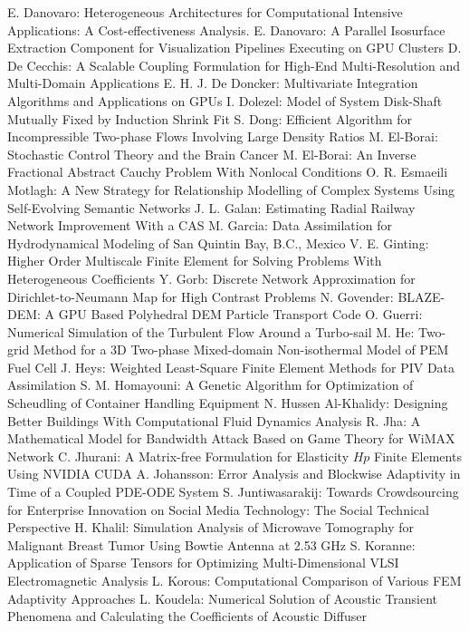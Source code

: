 \documentclass[10pt, A4]{article}%
\begin{document}
{E. Danovaro}: {Heterogeneous Architectures for Computational Intensive Applications: A Cost-effectiveness Analysis.}
{E. Danovaro}: {A Parallel Isosurface Extraction Component for Visualization Pipelines Executing on GPU Clusters}
{D. De Cecchis}: {A Scalable Coupling Formulation for High-End Multi-Resolution and Multi-Domain Applications}
{E. H. J. De Doncker}: {Multivariate Integration Algorithms and Applications on GPUs}
{I. Dolezel}: {Model of System Disk-Shaft Mutually Fixed by Induction Shrink Fit}
{S. Dong}: {Efficient Algorithm for Incompressible Two-phase Flows Involving Large Density Ratios}
{M. El-Borai}: {Stochastic Control Theory and the Brain Cancer}
{M. El-Borai}: {An Inverse Fractional Abstract Cauchy Problem With Nonlocal Conditions}
{O. R. Esmaeili Motlagh}: {A New Strategy for Relationship Modelling of Complex Systems Using Self-Evolving Semantic Networks}
{J. L. Galan}: {Estimating Radial Railway Network Improvement With a CAS}
{M. Garcia}: {Data Assimilation for Hydrodynamical Modeling of San Quintin Bay, B.C., Mexico}
{V. E. Ginting}: {Higher Order Multiscale Finite Element for Solving Problems With Heterogeneous Coefficients}
{Y. Gorb}: {Discrete Network Approximation for Dirichlet-to-Neumann Map for High Contrast Problems}
{N. Govender}: {BLAZE-DEM: A GPU Based Polyhedral DEM Particle Transport Code}
{O. Guerri}: {Numerical Simulation of the Turbulent Flow Around a Turbo-sail}
{M. He}: {Two-grid Method for a 3D Two-phase Mixed-domain Non-isothermal Model of PEM Fuel Cell}
{J. Heys}: {Weighted Least-Square Finite Element Methods for PIV Data Assimilation}
{S. M. Homayouni}: {A Genetic Algorithm for Optimization of Scheudling of Container Handling Equipment}
{N. Hussen Al-Khalidy}: {Designing Better Buildings With Computational Fluid Dynamics Analysis}
{R. Jha}: {A Mathematical Model for Bandwidth Attack Based on Game Theory for WiMAX Network}
{C. Jhurani}: {A Matrix-free Formulation for Elasticity $Hp$ Finite Elements Using NVIDIA CUDA}
{A. Johansson}: {Error Analysis and Blockwise Adaptivity in Time of a Coupled PDE-ODE System}
{S. Juntiwasarakij}: {Towards Crowdsourcing for Enterprise Innovation on Social Media Technology: The Social Technical Perspective}
{H. Khalil}: {Simulation Analysis of Microwave Tomography for Malignant Breast Tumor Using Bowtie Antenna at 2.53 GHz}
{S. Koranne}: {Application of Sparse Tensors for Optimizing Multi-Dimensional VLSI Electromagnetic Analysis}
{L. Korous}: {Computational Comparison of Various FEM Adaptivity Approaches}
{L. Koudela}: {Numerical Solution of Acoustic Transient Phenomena and Calculating the Coefficients of Acoustic Diffuser}
\end{document}
